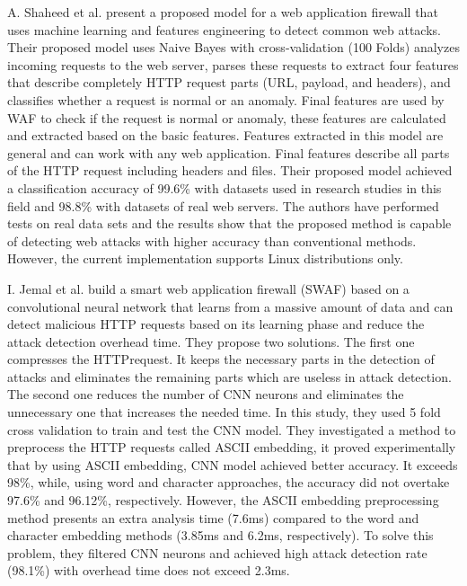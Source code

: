 A. Shaheed et al. \cite{Shaheed} present a proposed model for a web application firewall that uses machine learning and features engineering to detect common web attacks. Their proposed model uses Naive Bayes with cross-validation (100 Folds) analyzes incoming requests to the web server, parses these requests to extract four features that describe completely HTTP request parts (URL, payload, and headers), and classifies whether a request is normal or an anomaly. Final features are used by WAF to check if the request is normal or anomaly, these features are calculated and extracted based on the basic features. Features extracted in this model are general and can work with any web application. Final features describe all parts of the HTTP request including headers and files. Their proposed model achieved a classification accuracy of 99.6\% with datasets used in research studies in this field and 98.8\% with datasets of real web servers. The authors have performed tests on real data sets and the results show that the proposed method is capable of detecting web attacks with higher accuracy than conventional methods. However, the current implementation supports Linux distributions only. 

I. Jemal et al. \cite{Jemal} build a smart web application ﬁrewall (SWAF) based on a convolutional neural network that learns from a massive amount of data and can detect malicious HTTP requests based on its learning phase and reduce the attack detection overhead time. They propose two solutions. The ﬁrst one compresses the HTTPrequest. It keeps the necessary parts in the detection of attacks and eliminates the remaining parts which are useless in attack detection. The second one reduces the number of CNN neurons and eliminates the unnecessary one that increases the needed time. In this study, they used 5 fold cross validation to train and test the CNN model. They investigated a method to preprocess the HTTP requests called ASCII embedding, it proved experimentally that by using ASCII embedding, CNN model achieved better accuracy. It exceeds 98\%, while, using word and character approaches, the accuracy did not overtake 97.6\% and 96.12\%, respectively. However, the ASCII embedding preprocessing method presents an extra analysis time (7.6ms) compared to the word and character embedding methods (3.85ms and 6.2ms, respectively). To solve this problem, they filtered CNN neurons and achieved high attack detection rate (98.1\%) with overhead time does not exceed 2.3ms.

